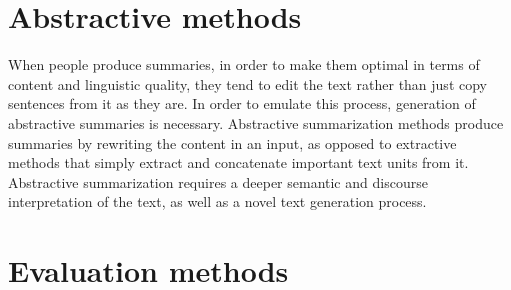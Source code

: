 \documentclass[11pt,a4paper,onecolumn]{article}
\begin{document}
  \section{Abstractive methods}
  When people produce summaries, in order to make them optimal in terms of content and linguistic quality, they tend to edit the text rather than just copy sentences from it as they are.
  In order to emulate this process, generation of abstractive summaries is necessary.
  Abstractive summarization methods produce summaries by rewriting the content in an input, as opposed to extractive methods that simply extract and concatenate important text units from it.
  Abstractive summarization requires a deeper semantic and discourse interpretation of the text, as well as a novel text generation process.

  \section{Evaluation methods}


%
%



\appendix
\end{document}
